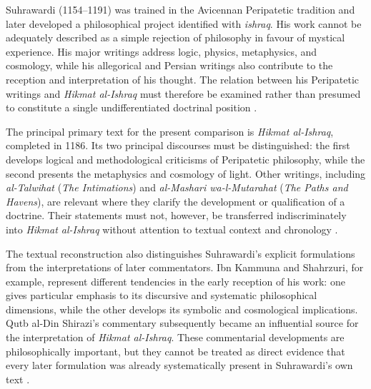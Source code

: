 \label{para:VS.B01.P01.C08.S14.SS02.P001}

Suhrawardi (1154--1191) was trained in the Avicennan Peripatetic
tradition and later developed a philosophical project identified
with \textit{ishraq}. His work cannot be adequately described as
a simple rejection of philosophy in favour of mystical experience.
His major writings address logic, physics, metaphysics, and
cosmology, while his allegorical and Persian writings also
contribute to the reception and interpretation of his thought.
The relation between his Peripatetic writings and
\textit{Hikmat al-Ishraq} must therefore be examined rather than
presumed to constitute a single undifferentiated doctrinal
position \citep{MarcotteSuhrawardiSEP2019,ZiaiKnowledgeIllumination1990}.

\label{para:VS.B01.P01.C08.S14.SS02.P002}

The principal primary text for the present comparison is
\textit{Hikmat al-Ishraq}, completed in 1186. Its two principal
discourses must be distinguished: the first develops logical
and methodological criticisms of Peripatetic philosophy, while
the second presents the metaphysics and cosmology of light.
Other writings, including \textit{al-Talwihat}
(\textit{The Intimations}) and \textit{al-Mashari wa-l-Mutarahat}
(\textit{The Paths and Havens}), are relevant where they clarify
the development or qualification of a doctrine. Their statements
must not, however, be transferred indiscriminately into
\textit{Hikmat al-Ishraq} without attention to textual context
and chronology \citep{SuhrawardiPhilosophyIllumination,MarcotteSuhrawardiSEP2019}.

\label{para:VS.B01.P01.C08.S14.SS02.P003}

The textual reconstruction also distinguishes Suhrawardi's
explicit formulations from the interpretations of later
commentators. Ibn Kammuna and Shahrzuri, for example, represent
different tendencies in the early reception of his work:
one gives particular emphasis to its discursive and systematic
philosophical dimensions, while the other develops its symbolic
and cosmological implications. Qutb al-Din Shirazi's commentary
subsequently became an influential source for the interpretation
of \textit{Hikmat al-Ishraq}. These commentarial developments
are philosophically important, but they cannot be treated as
direct evidence that every later formulation was already
systematically present in Suhrawardi's own text
\citep{MarcotteSuhrawardiSEP2019,WalbridgeLeavenAncients2000}.

